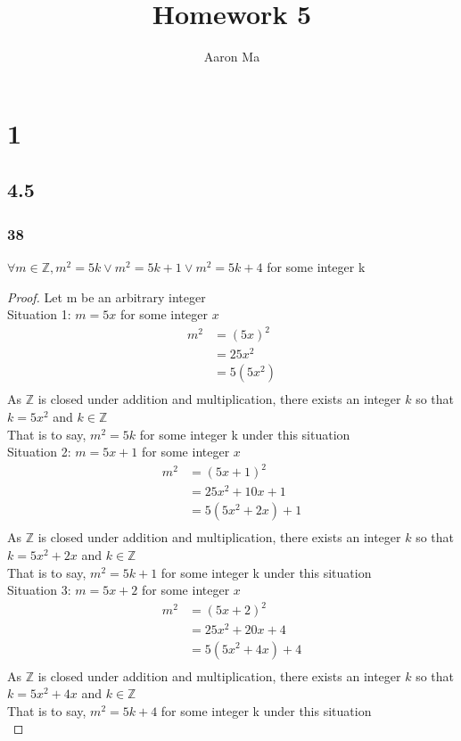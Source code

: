 \documentclass{article}
\title{Homework 5}
\author{Aaron Ma}
\begin{document}
\maketitle
\section{1}
\subsection{4.5}
\subsubsection{38}
$\forall m \in \mathbb{Z}, m^2 = 5k \vee m^2 = 5k+1 \vee m^2 = 5k + 4$ for some integer k
\begin{proof}
Let m be an arbitrary integer\\
Situation 1: $m = 5x$ for some integer $x$\\
\begin{align*}
    m^2 &= (5x)^2\\
    &= 25x^2\\
    &= 5(5x^2)\\
\end{align*}
As $\mathbb{Z}$ is closed under addition and multiplication, there exists an integer $k$ so that $k = 5x^2$ and $k \in \mathbb{Z}$\\
That is to say, $m^2 = 5k$ for some integer k under this situation\\

Situation 2: $m = 5x + 1$ for some integer $x$\\
\begin{align*}
    m^2 &= (5x+1)^2\\
    &= 25x^2 + 10x + 1\\
    &= 5(5x^2 + 2x) + 1\\
\end{align*}
As $\mathbb{Z}$ is closed under addition and multiplication, there exists an integer $k$ so that $k = 5x^2 + 2x$ and $k \in \mathbb{Z}$\\
That is to say, $m^2 = 5k + 1$ for some integer k under this situation \\ 

Situation 3: $m = 5x +2$ for some integer $x$\\
\begin{align*}
    m^2 &= (5x + 2)^2\\
    &= 25x^2 + 20x + 4\\
    &= 5(5x^2 + 4x) + 4\\
\end{align*}
As $\mathbb{Z}$ is closed under addition and multiplication, there exists an integer $k$ so that $k = 5x^2 + 4x$ and $k \in \mathbb{Z}$\\
That is to say, $m^2 = 5k + 4$ for some integer k under this situation\\


\end{proof}
\end{document}
